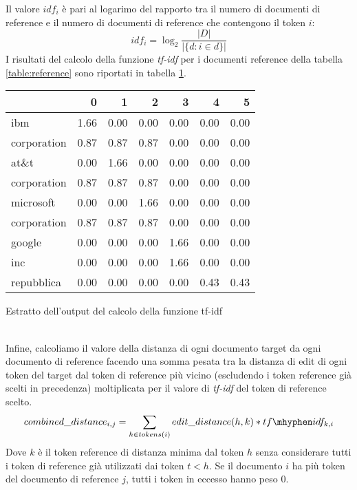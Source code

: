 \documentclass[a4paper,12pt,openany,oneside]{article}
\begin{document}
Il valore $idf_i$ è pari al logarimo del rapporto tra il numero di documenti di reference e il numero di documenti di reference che contengono il token $i$:
\begin{equation}
idf_i = \log_2{\frac{|D|}{|\{d : i \in d\}|}}
\end{equation}
I risultati del calcolo della funzione \textit{tf-idf} per i documenti reference della tabella \ref{table:reference} sono riportati in tabella \ref{table:tfidf}.
\begin{table}
\scriptsize
\centering
	\begin{tabularx}{0.48\textwidth}{l | rrrrrr}
		{} & {0} & {1} & {2} & {3} & {4} & {5} \\
		\midrule
		{ibm} & {1.66} & {0.00} & {0.00} & {0.00} & {0.00} & {0.00} \\
		{corporation} & {0.87} & {0.87} & {0.87} & {0.00} & {0.00} & {0.00} \\
		{at\&t} & {0.00} & {1.66} & {0.00} & {0.00} & {0.00} & {0.00} \\
		{corporation} & {0.87} & {0.87} & {0.87} & {0.00} & {0.00} & {0.00} \\
		{microsoft} & {0.00} & {0.00} & {1.66} & {0.00} & {0.00} & {0.00} \\
		{corporation} & {0.87} & {0.87} & {0.87} & {0.00} & {0.00} & {0.00} \\
		{google} & {0.00} & {0.00} & {0.00} & {1.66} & {0.00} & {0.00} \\
		{inc} & {0.00} & {0.00} & {0.00} & {1.66} & {0.00} & {0.00} \\
		{repubblica} & {0.00} & {0.00} & {0.00} & {0.00} & {0.43} & {0.43} \\
	\end{tabularx}
	 {Estratto dell'output del calcolo della funzione tf-idf}
	\label{table:tfidf}
\end{table}
\\[1.8em]
Infine, calcoliamo il valore della distanza di ogni documento target da ogni documento di reference facendo una somma pesata tra la distanza di edit di ogni token del target dal token di reference più vicino (escludendo i token reference già scelti in precedenza) moltiplicata per il valore di \textit{tf-idf} del token di reference scelto.
\begin{equation}
combined\_distance_{i,j} = \sum_{h \in tokens(i)} edit\_distance(h, k) * tf \mhyphen idf_{k,i}
\end{equation}
Dove $k$ è il token reference di distanza minima dal token $h$ senza considerare tutti i token di reference già utilizzati dai token $t<h$. Se il documento $i$ ha più token del documento di reference $j$, tutti i token in eccesso hanno peso 0.
\end{document}
